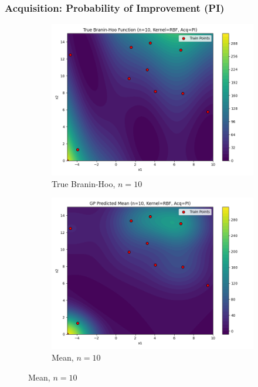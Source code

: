 \documentclass[a4paper,12pt]{article}
\begin{document}
\subsubsection*{Acquisition: Probability of Improvement (PI)}
\begin{figure}[H]
\centering

\begin{subfigure}{0.3\textwidth}
  \includegraphics[width=\linewidth]{Task-02/images/true_function_rbf_n10_PI.png}
  \caption{True Branin-Hoo, $n=10$}
\end{subfigure}
\begin{subfigure}{0.3\textwidth}
    \includegraphics[width=\linewidth]{Task-02/images/gp_mean_rbf_n10_PI.png}
    \caption{Mean, $n=10$}

\end{subfigure}
\end{figure}
\end{document}
